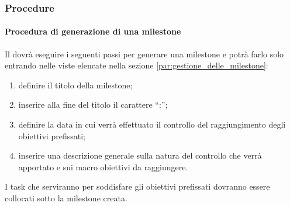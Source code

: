 
			
		\subsubsection{Procedure}
			\paragraph{Procedura di generazione di una milestone} %
			\label{par:procedura_di_generazione_di_una_milestone}
			Il \roleProjectManager{} dovrà eseguire i seguenti passi per generare una milestone e potrà farlo solo entrando nelle viste elencate nella sezione \ref{par:gestione_delle_milestone}:
				\begin{enumerate}
					\item definire il titolo della milestone;
					\item inserire alla fine del titolo il carattere ``:'';
					\item definire la data in cui verrà effettuato il controllo del raggiungimento degli obiettivi prefissati;
					\item inserire una descrizione generale sulla natura del controllo che verrà apportato e sui macro obiettivi da raggiungere.
				\end{enumerate}
			\noindent
			I task che serviranno per soddisfare gli obiettivi prefissati dovranno essere collocati sotto la milestone creata.
		

